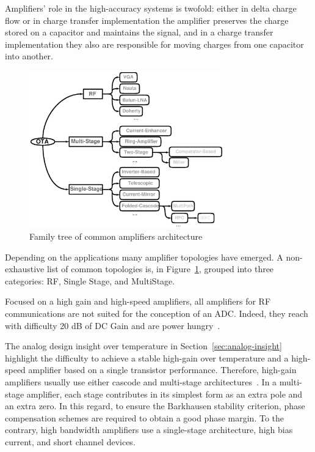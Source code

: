 Amplifiers' role in the high-accuracy systems is twofold: either in delta charge flow or in charge transfer implementation the amplifier preserves the charge stored on a capacitor and maintains the signal, and in a charge transfer implementation they also are responsible for moving charges from one capacitor into another.

\begin{figure}[htp]
    \centering
    \includegraphics[width=0.75\textwidth]{Chapter7/Figs/family_amplifier.ps}
    \caption{Family tree of common amplifiers architecture}
    \label{fig:ota_tree}
\end{figure}

Depending on the applications many amplifier topologies have emerged. A non-exhaustive list of common topologies is, in Figure~\ref{fig:ota_tree}, grouped into three categories: RF, Single Stage, and MultiStage.

Focused on a high gain and high-speed amplifiers, all amplifiers for RF communications are not suited for the conception of an ADC\@. Indeed, they reach with difficulty 20 dB of DC Gain and are power hungry~\cite{Nauta1992, Chen2014}.

The analog design insight over temperature in Section~\ref{sec:analog-insight} highlight the difficulty to achieve a stable high-gain over temperature and a high-speed amplifier based on a single transistor performance. Therefore, high-gain amplifiers usually use either cascode and multi-stage architectures~\cite{Bult1990}. In a multi-stage amplifier, each stage contributes in its simplest form as an extra pole and an extra zero. In this regard, to ensure the Barkhausen stability criterion, phase compensation schemes are required to obtain a good phase margin.
To the contrary, high bandwidth amplifiers use a single-stage architecture, high bias current, and short channel devices.


